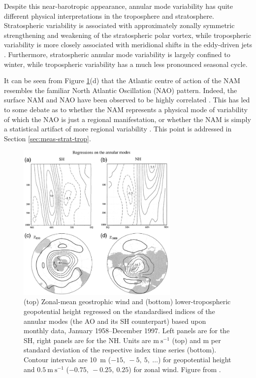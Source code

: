 Despite this near-barotropic appearance, annular mode variability has quite
different physical interpretations in the troposphere and
stratosphere. Stratospheric variability is associated with approximately zonally
symmetric strengthening and weakening of the stratospheric polar vortex, while
tropospheric variability is more closely associated with meridional shifts in
the eddy-driven jets \citep{Limpasuvan1999}. Furthermore, stratospheric annular
mode variability is largely confined to winter, while tropospheric variability
has a much less pronounced seasonal cycle.

It can be seen from Figure \ref{fig:annular_modes}(d) that the Atlantic centre
of action of the NAM resembles the familiar North Atlantic Oscillation (NAO)
pattern. Indeed, the surface NAM and NAO have been observed to be highly
correlated \citep{Ambaum2001}. This has led to some debate as to whether the NAM
represents a physical mode of variability of which the NAO is just a regional
manifestation, or whether the NAM is simply a statistical artifact of more
regional variability \citep[e.g.,][]{Deser2000,Wallace2002}. This point is
addressed in Section \ref{sec:meas-strat-trop}.

\begin{figure}
 \centering
 \noindent\includegraphics[width=0.7\textwidth]{figures/chapter-intro/annular_modes_TW2.png}
 \caption[Annular mode patterns from \citet{Thompson2000a}]{(top) Zonal-mean
   geostrophic wind and (bottom) lower-tropospheric geopotential height
   regressed on the standardised indices of the annular modes (the AO and its SH
   counterpart) based upon monthly data, January 1958--December 1997. Left
   panels are for the SH, right panels are for the NH. Units are
   $\mathrm{m~s^{-1}}$ (top) and m per standard deviation of the respective
   index time series (bottom). Contour intervals are 10~m ($-15,~-5,~5,~\dots$)
   for geopotential height and $\mathrm{0.5~m~s^{-1}}$ ($-0.75,~-0.25,~0.25$)
   for zonal wind. Figure from \citet{Thompson2000a}.}
 \label{fig:annular_modes}
\end{figure}


